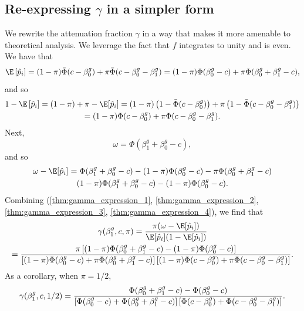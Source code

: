 \documentclass[11pt]{article}
\begin{document}
\begin{appendices}
\begin{refsection}
\subsection{Re-expressing $\gamma$ in a simpler form}\label{sec:simplication}
We rewrite the attenuation fraction $\gamma$ in a way that makes it more amenable to theoretical analysis. We leverage the fact that $f$ integrates to unity and is even. We have that
\begin{equation}\label{thm:gamma_expression_1} \E\left[\hat{p}_i\right] = (1 - \pi) \bar{\Phi}(c - \beta_0^g) + \pi \bar{\Phi}(c - \beta^g_0 - \beta^g_1) = (1 - \pi) \Phi(\beta_0^g - c) + \pi\Phi(\beta^g_0 + \beta^g_1 - c), \end{equation}
 and so \begin{multline}\label{thm:gamma_expression_2} 1 - \E\left[\hat{p}_i\right] = (1 - \pi) + \pi - \E[\hat{p}_i]  = (1-\pi) \left(1 - \bar{\Phi}(c - \beta_0^g)\right)  + \pi \left(1 - \bar{\Phi}(c - \beta^g_0 - \beta^g_1) \right) \\ = (1 - \pi)\Phi(c - \beta^g_0) + \pi \Phi(c - \beta_0^g - \beta_1^g).
\end{multline}
Next,
\begin{equation}\label{thm:gamma_expression_3}
\omega = \Phi(\beta^g_1 + \beta^g_0 - c),\end{equation} and so
\begin{multline}\label{thm:gamma_expression_4}
\omega - \E[\hat{p}_i] = \Phi(\beta^g_1 + \beta^g_0 - c) - (1-\pi)\Phi(\beta^g_0 - c) - \pi \Phi(\beta^g_0 + \beta^g_1 - c)  \\ (1-\pi)\Phi(\beta^g_1 + \beta^g_0 - c)  - (1-\pi)\Phi(\beta^g_0 - c).
\end{multline}
Combining (\ref{thm:gamma_expression_1}, \ref{thm:gamma_expression_2}, \ref{thm:gamma_expression_3}, \ref{thm:gamma_expression_4}), we find that
\begin{multline}\label{gamma_alternative}
\gamma(\beta^g_1, c, \pi) = \frac{\pi(\omega - \E[\hat{p}_i])}{\E[\hat{p}_i](1 - \E[\hat{p}_i])} \\ = \frac{\pi \left[(1 - \pi) \Phi(\beta_0^g + \beta_1^g - c) - (1 - \pi) \Phi(\beta_0^g - c)\right]}{\left[(1-\pi)\Phi(\beta_0^g - c) + \pi \Phi(\beta^g_0 + \beta^g_1 - c) \right] \left[(1 - \pi) \Phi(c - \beta^g_0) + \pi\Phi(c - \beta_0^g - \beta_1^g) \right]}.
\end{multline}
As a corollary, when $\pi = 1/2$,
\begin{equation}\label{gamma_alternative_pi_half}
\gamma(\beta^g_1, c, 1/2)  \\ = \frac{\Phi(\beta_0^g + \beta_1^g - c) - \Phi(\beta_0^g - c) }{\left[\Phi(\beta_0^g - c) +\Phi(\beta^g_0 + \beta^g_1 - c)\right] \left[\Phi(c - \beta^g_0) + \Phi(c - \beta_0^g - \beta_1^g) \right]}.

\end{equation}
\end{refsection}
\end{appendices}
\end{document}
